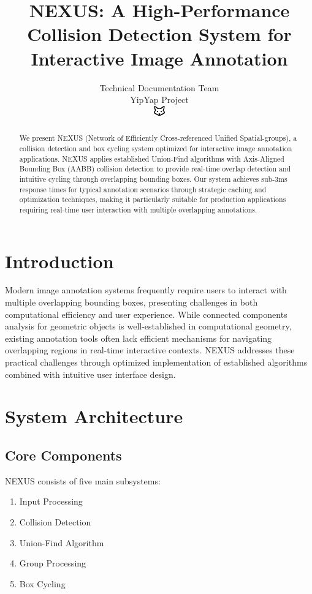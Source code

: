 \documentclass[10pt]{article}
\begin{document}
\title{NEXUS: A High-Performance Collision Detection System for Interactive Image Annotation}

\author{Technical Documentation Team\\
YipYap Project\\
\includegraphics[width=0.5cm]{favicon.pdf}}

\maketitle

\begin{abstract}
We present NEXUS (Network of Efficiently Cross-referenced Unified Spatial-groups), a collision detection and box cycling system optimized for interactive image annotation applications. NEXUS applies established Union-Find algorithms with Axis-Aligned Bounding Box (AABB) collision detection to provide real-time overlap detection and intuitive cycling through overlapping bounding boxes. Our system achieves sub-3ms response times for typical annotation scenarios through strategic caching and optimization techniques, making it particularly suitable for production applications requiring real-time user interaction with multiple overlapping annotations.
\end{abstract}

\section{Introduction}
Modern image annotation systems frequently require users to interact with multiple overlapping bounding boxes, presenting challenges in both computational efficiency and user experience. While connected components analysis for geometric objects is well-established in computational geometry, existing annotation tools often lack efficient mechanisms for navigating overlapping regions in real-time interactive contexts. NEXUS addresses these practical challenges through optimized implementation of established algorithms combined with intuitive user interface design.

\section{System Architecture}
\subsection{Core Components}
NEXUS consists of five main subsystems:
\begin{enumerate}
    \item Input Processing
    \item Collision Detection
    \item Union-Find Algorithm
    \item Group Processing
    \item Box Cycling
\end{enumerate}
\end{document}
